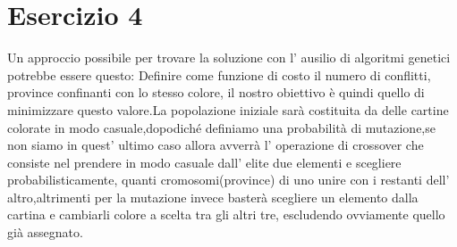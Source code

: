 	\section{Esercizio 4}
		\label{sec:es4}
		Un approccio possibile per trovare la soluzione con l' ausilio di algoritmi genetici potrebbe essere questo:
		Definire come funzione di costo il numero di conflitti, province confinanti con lo stesso colore, il nostro obiettivo è quindi quello di minimizzare questo valore.La popolazione iniziale sarà costituita da delle cartine colorate in modo casuale,dopodiché definiamo una probabilità di mutazione,se non siamo in quest' ultimo caso allora avverrà l' operazione di crossover che consiste nel prendere in modo casuale dall' elite due elementi e scegliere probabilisticamente, quanti cromosomi(province) di uno unire con i restanti dell' altro,altrimenti per la mutazione invece basterà scegliere un elemento dalla cartina e cambiarli colore a scelta tra gli altri tre, escludendo ovviamente quello già assegnato. 
		